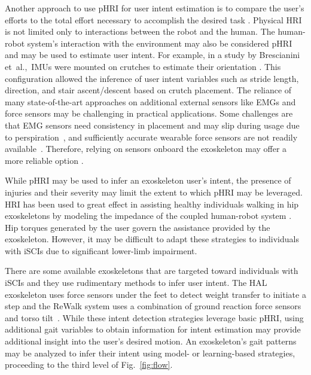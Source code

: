 Another approach to use pHRI for user intent estimation is to compare the user's efforts to the total effort necessary to accomplish the desired task \cite{pehlivan2015minimal}. Physical HRI is not limited only to interactions between the robot and the human. The human-robot system's interaction with the environment may also be considered pHRI and may be used to estimate user intent. For example, in a study by Brescianini \mbox{et al.,}~IMUs were mounted on crutches to estimate their orientation \cite{brescianini2011ins}. This configuration allowed the inference of user intent variables such as stride length, direction, and stair ascent/descent based on crutch placement. The reliance of many state-of-the-art approaches on additional external sensors like EMGs and force sensors may be challenging in practical applications. Some challenges are that EMG sensors need consistency in placement and may slip during usage due to perspiration~\mbox{\cite{tkach2010study,ison2014role}}, and sufficiently accurate wearable force sensors are not readily available~\cite{moolchandani2021design}. Therefore, relying on sensors onboard the exoskeleton may offer a more reliable option \cite{Gambon20b}. 

While pHRI may be used to infer an exoskeleton user's intent, the presence of injuries and their severity may limit the extent to which pHRI may be leveraged. HRI has been used to great effect in assisting healthy individuals walking in hip exoskeletons by modeling the impedance of the coupled human-robot system \cite{zhang2019admittance,nagarajan2016integral}. Hip torques generated by the user govern the assistance provided by the exoskeleton. However, it may be difficult to adapt these strategies to individuals with iSCIs due to significant lower-limb impairment. 

There are some available exoskeletons that are targeted toward individuals with iSCIs and they use rudimentary methods to infer user intent. The HAL exoskeleton uses force sensors under the feet to detect weight transfer to initiate a step \cite{suzuki2007intention} and the ReWalk system uses a combination of ground reaction force sensors and torso tilt~\cite{goffer2012locomotion}. While these intent detection strategies leverage basic pHRI, using additional gait variables to obtain information for intent estimation may provide additional insight into the user's desired motion. An exoskeleton's gait patterns may be analyzed to infer their intent using model- or learning-based strategies, proceeding to the third level of Fig.~\ref{fig:flow}. 

